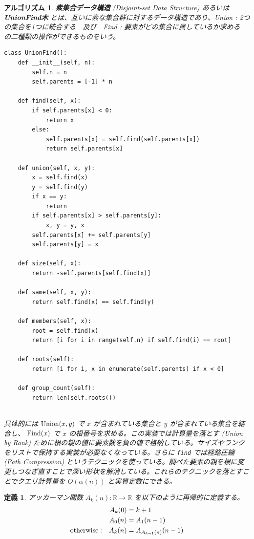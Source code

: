 \documentclass[12pt, a4j]{ltjsarticle}
\newtheorem{defi}[thm]{定義}
\newtheorem{alg}[thm]{アルゴリズム}
\begin{document}
\begin{alg} {\bf 素集合データ構造} (Disjoint-set Data Structure) あるいは {\bf UnionFind木} とは、互いに素な集合群に対するデータ構造であり、Union : 2つの集合を1つに統合する　及び　Find : 要素がどの集合に属しているか求める　の二種類の操作ができるものをいう。\\\upshape
\begin{lstlisting}
class UnionFind():
    def __init__(self, n):
        self.n = n
        self.parents = [-1] * n

    def find(self, x):
        if self.parents[x] < 0:
            return x
        else:
            self.parents[x] = self.find(self.parents[x])
            return self.parents[x]

    def union(self, x, y):
        x = self.find(x)
        y = self.find(y)
        if x == y:
            return
        if self.parents[x] > self.parents[y]:
            x, y = y, x
        self.parents[x] += self.parents[y]
        self.parents[y] = x

    def size(self, x):
        return -self.parents[self.find(x)]

    def same(self, x, y):
        return self.find(x) == self.find(y)

    def members(self, x):
        root = self.find(x)
        return [i for i in range(self.n) if self.find(i) == root]

    def roots(self):
        return [i for i, x in enumerate(self.parents) if x < 0]

    def group_count(self):
        return len(self.roots())
\end{lstlisting}\quad\\
具体的には ${\rm Union}(x,y)$ で $x$ が含まれている集合と $y$ が含まれている集合を結合し、 ${\rm Find}(x)$ で $x$ の根番号を求める。この実装では計算量を落とす (Union by Rank) ために根の親の値に要素数を負の値で格納している。サイズやランクをリストで保持する実装が必要なくなっている。さらに \lstinline{find} では経路圧縮 (Path Compression) というテクニックを使っている。調べた要素の親を根に変更しつなぎ直すことで深い形状を解消している。これらのテクニックを落とすことでクエリ計算量を $O(\alpha(n))$ と実質定数にできる。
\end{alg}

\vspace{1cm}

\begin{defi} アッカーマン関数 $A_k(n):\mathbb{R}\rightarrow\mathbb{R}$ を以下のように再帰的に定義する。
\begin{align}
A_k (0) &= k + 1 \\
A_0 (n) &= A_1(n - 1) \\
{\rm otherwise:\quad}A_k (n) &= A_{A_{k - 1}(n)}(n - 1)
\end{align}
\end{defi}
\end{document}
